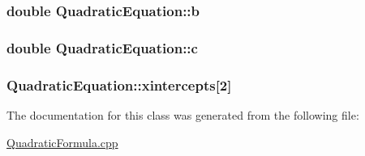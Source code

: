 \subsubsection[{\texorpdfstring{b}{b}}]{\setlength{\rightskip}{0pt plus 5cm}double Quadratic\+Equation\+::b}\hypertarget{classQuadraticEquation_a7c3b8208e2d36d576d17bee5a7ce812f}{}\label{classQuadraticEquation_a7c3b8208e2d36d576d17bee5a7ce812f}
\subsubsection[{\texorpdfstring{c}{c}}]{\setlength{\rightskip}{0pt plus 5cm}double Quadratic\+Equation\+::c}\hypertarget{classQuadraticEquation_a3ea57c6e9d39a8f4ee2b029db6a8e6d8}{}\label{classQuadraticEquation_a3ea57c6e9d39a8f4ee2b029db6a8e6d8}
\subsubsection[{\texorpdfstring{xintercepts}{xintercepts}}]{ Quadratic\+Equation\+::xintercepts\mbox{[}2\mbox{]}}\hypertarget{classQuadraticEquation_a5001f513b8982984dd1b2efe43972d37}{}\label{classQuadraticEquation_a5001f513b8982984dd1b2efe43972d37}


The documentation for this class was generated from the following file\+:\begin{DoxyCompactItemize}
\item 
\hyperlink{QuadraticFormula_8cpp}{Quadratic\+Formula.\+cpp}\end{DoxyCompactItemize}
